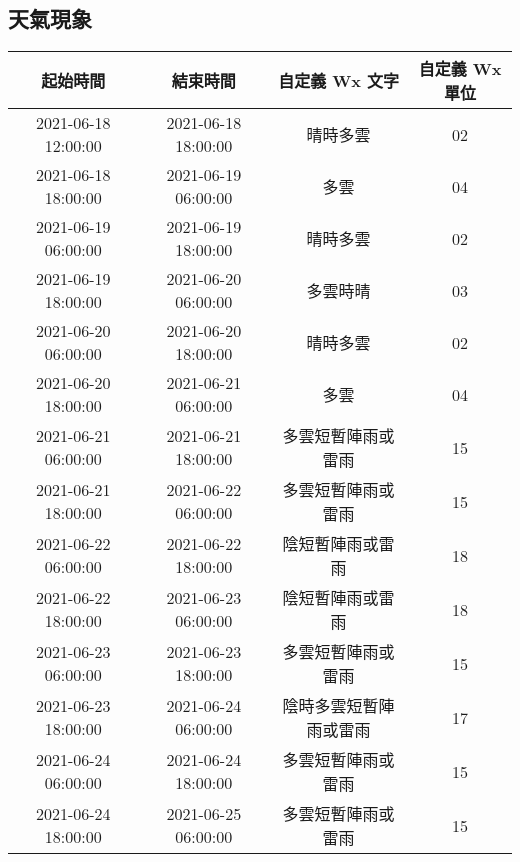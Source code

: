 \documentclass{article}%
\begin{document}
\begin{center}
\section{天氣現象}%
\label{sec:}%
\begin{tabular}{|c|c|c|c|}%
\hline%
起始時間&結束時間&自定義 Wx 文字&自定義 Wx 單位\\%
\hline%
2021{-}06{-}18 12:00:00&2021{-}06{-}18 18:00:00&晴時多雲&02\\%
\hline%
2021{-}06{-}18 18:00:00&2021{-}06{-}19 06:00:00&多雲&04\\%
\hline%
2021{-}06{-}19 06:00:00&2021{-}06{-}19 18:00:00&晴時多雲&02\\%
\hline%
2021{-}06{-}19 18:00:00&2021{-}06{-}20 06:00:00&多雲時晴&03\\%
\hline%
2021{-}06{-}20 06:00:00&2021{-}06{-}20 18:00:00&晴時多雲&02\\%
\hline%
2021{-}06{-}20 18:00:00&2021{-}06{-}21 06:00:00&多雲&04\\%
\hline%
2021{-}06{-}21 06:00:00&2021{-}06{-}21 18:00:00&多雲短暫陣雨或雷雨&15\\%
\hline%
2021{-}06{-}21 18:00:00&2021{-}06{-}22 06:00:00&多雲短暫陣雨或雷雨&15\\%
\hline%
2021{-}06{-}22 06:00:00&2021{-}06{-}22 18:00:00&陰短暫陣雨或雷雨&18\\%
\hline%
2021{-}06{-}22 18:00:00&2021{-}06{-}23 06:00:00&陰短暫陣雨或雷雨&18\\%
\hline%
2021{-}06{-}23 06:00:00&2021{-}06{-}23 18:00:00&多雲短暫陣雨或雷雨&15\\%
\hline%
2021{-}06{-}23 18:00:00&2021{-}06{-}24 06:00:00&陰時多雲短暫陣雨或雷雨&17\\%
\hline%
2021{-}06{-}24 06:00:00&2021{-}06{-}24 18:00:00&多雲短暫陣雨或雷雨&15\\%
\hline%
2021{-}06{-}24 18:00:00&2021{-}06{-}25 06:00:00&多雲短暫陣雨或雷雨&15\\%
\hline%
\end{tabular}

%

\end{center}
\end{document}
